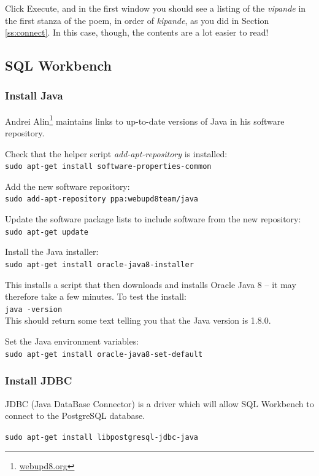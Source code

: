Click Execute, and in the first window you should see a listing of the \textit{vipande} in the first stanza of the poem, in order of \textit{kipande}, as you did in Section \ref{ss:connect}.  In this case, though, the contents are a lot easier to read!


\subsection{SQL Workbench}
\label{ss:workbench}

\subsubsection{Install Java}

Andrei Alin\footnote{\url{webupd8.org}} maintains links to up-to-date versions of Java in his software repository.

Check that the helper script \textit{add-apt-repository} is installed:\\
\verb|sudo apt-get install software-properties-common|

Add the new software repository:\\
\verb|sudo add-apt-repository ppa:webupd8team/java|

Update the software package lists to include software from the new repository:\\
\verb|sudo apt-get update|

Install the Java installer:\\
\verb|sudo apt-get install oracle-java8-installer|

This installs a script that then downloads and installs Oracle Java 8 -- it may therefore take a few minutes.  To test the install:\\
\verb|java -version|\\
This should return some text telling you that the Java version is 1.8.0.

Set the Java environment variables:\\
\verb|sudo apt-get install oracle-java8-set-default|

\subsubsection{Install JDBC}
\label{ss:jdbc}

JDBC (Java DataBase Connector) is a driver which will allow SQL Workbench to connect to the PostgreSQL database.

\verb|sudo apt-get install libpostgresql-jdbc-java|

